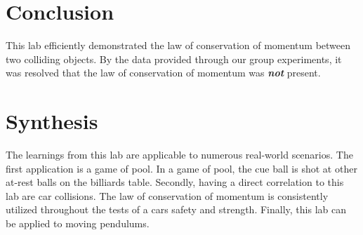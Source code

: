 \documentclass{article}
\begin{document}
\section*{Conclusion}
This lab efficiently demonstrated the law of conservation of momentum between two colliding objects.
By the data provided through our group experiments, it was resolved that the law of
conservation of momentum was \textbf{\textit{not}} present.
\newline

\section*{Synthesis}
The learnings from this lab are applicable to numerous real-world scenarios.
The first application is a game of pool. In a game of pool, the cue ball is shot at other at-rest balls on the billiards table.
Secondly, having a direct correlation to this lab are car collisions. The law of conservation of momentum is consistently utilized
throughout the tests of a cars safety and strength. Finally, this lab can be applied to moving pendulums.
\end{document}
